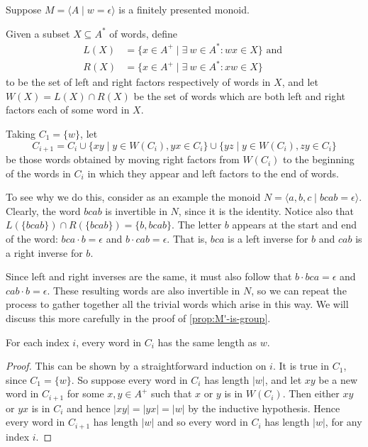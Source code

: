 \documentclass[noindex,noinsetproof,12pt]{lmaths}
\begin{document}
Suppose $M = \langle A \mid w = \epsilon\rangle$ is a finitely presented monoid.

Given a subset $X \subseteq A^*$ of words, define
	\begin{align*}
		L(X) &= \{ x \in A^+ \mid \exists\ w \in A^* \colon wx \in X \} \text{ and } \\
		R(X) &= \{ x \in A^+ \mid \exists\ w \in A^* \colon xw \in X \}
	\end{align*}
to be the set of left and right factors respectively of words in $X$, and let $W(X) = L(X) \cap R(X)$ be the set of words which are both left and right factors each of some word in $X$.

Taking $C_1 = \{w\}$, let
	\[ C_{i+1} = C_i \cup \{ xy \mid y \in W(C_i), yx \in C_i \} \cup \{ yz \mid y \in W(C_i), zy \in C_i \} \]
be those words obtained by moving right factors from $W(C_i)$ to the beginning of the words in $C_i$ in which they appear and left factors to the end of words.

To see why we do this, consider as an example the monoid $N = \langle a, b, c \mid bcab = \epsilon \rangle$. Clearly, the word $bcab$ is invertible in $N$, since it is the identity. Notice also that $L(\{bcab\}) \cap R(\{bcab\}) = \{b, bcab\}$. The letter $b$ appears at the start and end of the word: $bca \cdot b = \epsilon$ and $b \cdot cab = \epsilon$. That is, $bca$ is a left inverse for $b$ and $cab$ is a right inverse for $b$.

Since left and right inverses are the same, it must also follow that $b \cdot bca = \epsilon$ and $cab \cdot b = \epsilon$. These resulting words are also invertible in $N$, so we can repeat the process to gather together all the trivial words which arise in this way. We will discuss this more carefully in the proof of \cref{prop:M'-is-group}.


\begin{lemma}
	For each index $i$, every word in $C_i$ has the same length as $w$. \label{lma:Ci-length-w}
\end{lemma}
\begin{proof}
	This can be shown by a straightforward induction on $i$. It is true in $C_1$, since $C_1 = \{w\}$. So suppose every word in $C_i$ has length $|w|$, and let $xy$ be a new word in $C_{i+1}$ for some $x, y \in A^+$ such that $x$ or $y$ is in $W(C_i)$. Then either $xy$ or $yx$ is in $C_i$ and hence $|xy| = |yx| = |w|$ by the inductive hypothesis. Hence every word in $C_{i+1}$ has length $|w|$ and so every word in $C_i$ has length $|w|$, for any index $i$.
\end{proof}
\end{document}
